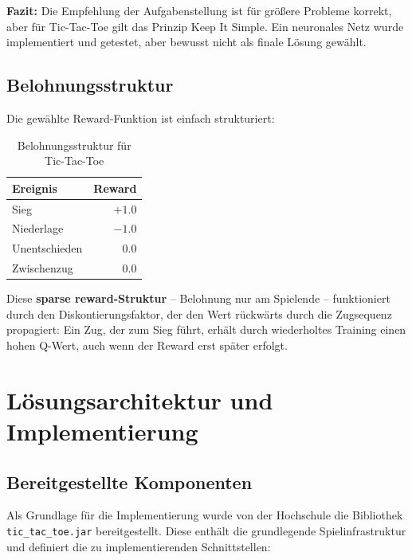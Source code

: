 \textbf{Fazit:} Die Empfehlung der Aufgabenstellung ist für größere Probleme korrekt, aber für Tic-Tac-Toe gilt das Prinzip \glqq Keep It Simple\grqq{}. Ein neuronales Netz wurde implementiert und getestet, aber bewusst nicht als finale Lösung gewählt.

\subsection{Belohnungsstruktur}

Die gewählte Reward-Funktion ist einfach strukturiert:

\begin{table}[H]
\centering
\begin{tabular}{l|r}
\textbf{Ereignis} & \textbf{Reward} \\
\hline
Sieg & $+1.0$ \\
Niederlage & $-1.0$ \\
Unentschieden & $0.0$ \\
Zwischenzug & $0.0$ \\
\end{tabular}
\caption{Belohnungsstruktur für Tic-Tac-Toe}
\end{table}

Diese \textbf{\glqq sparse reward\grqq{}-Struktur} -- Belohnung nur am Spielende -- funktioniert durch den Diskontierungsfaktor, der den Wert rückwärts durch die Zugsequenz propagiert: Ein Zug, der zum Sieg führt, erhält durch wiederholtes Training einen hohen Q-Wert, auch wenn der Reward erst später erfolgt.


\section{Lösungsarchitektur und Implementierung}

\subsection{Bereitgestellte Komponenten}

Als Grundlage für die Implementierung wurde von der Hochschule die Bibliothek \texttt{tic\_tac\_toe.jar} bereitgestellt. Diese enthält die grundlegende Spielinfrastruktur und definiert die zu implementierenden Schnittstellen:

